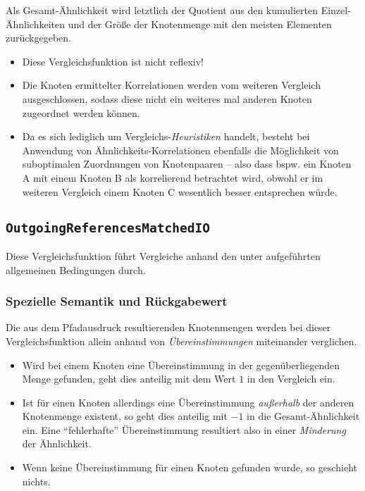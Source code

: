 Als Gesamt-Ähnlichkeit wird letztlich der Quotient aus den kumulierten Einzel-Ähnlichkeiten und der Größe der Knotenmenge mit den meisten Elementen zurückgegeben.

\begin{itemize}
	\item Diese Vergleichsfunktion ist nicht reflexiv!
	\item Die Knoten ermittelter Korrelationen werden vom weiteren Vergleich ausgeschlossen, sodass diese nicht ein weiteres mal anderen Knoten zugeordnet werden können.
	\item Da es sich lediglich um Vergleichs-\emph{Heuristiken} handelt, besteht bei Anwendung von Ähnlich\-keits-Korrelationen ebenfalls die Möglichkeit von suboptimalen Zuordnungen von Knotenpaaren -- also dass bspw. ein Knoten A mit einem Knoten B als korrelierend betrachtet wird, obwohl er im weiteren Vergleich einem Knoten C wesentlich besser entsprechen würde.
\end{itemize}


%
%
\subsection{\texttt{OutgoingReferencesMatchedIO}}
Diese Vergleichsfunktion führt Vergleiche anhand den unter\mylinebreak{} aufgeführten allgemeinen Bedingungen durch.

\subsubsection*{Spezielle Semantik und Rückgabewert}
Die aus dem Pfadausdruck resultierenden Knotenmengen werden bei dieser Vergleichsfunktion allein anhand von \emph{Übereinstimmungen} miteinander verglichen.
\begin{itemize}
	\item Wird bei einem Knoten eine Übereinstimmung in der gegenüberliegenden Menge gefunden, geht dies anteilig mit dem Wert $1$ in den Vergleich ein.
	\item Ist für einen Knoten allerdings eine Übereinstimmung \emph{außerhalb} der anderen Knotenmenge existent, so geht dies anteilig mit $-1$ in die Gesamt-Ähnlichkeit ein. Eine "`fehlerhafte"' Übereinstimmung resultiert also in einer \emph{Minderung} der Ähnlichkeit.
	\item Wenn keine Übereinstimmung für einen Knoten gefunden wurde, so geschieht nichts.
\end{itemize}

